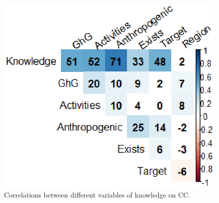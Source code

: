 \documentclass[11pt]{article}
\begin{document}
\begin{table}[!h] \centering 
  \caption{Factor loadings and weights chosen for different dimensions of knowledge on CC} 
  \label{table:loadings} 
 \end{table} 

\begin{figure}[!htbp]
\centering
\includegraphics[width=0.51\columnwidth]{correlations_knowledge.eps}
\caption{Correlations between different variables of knowledge on CC.}
\label{fig:correlations_K}
\end{figure}
\end{document}
